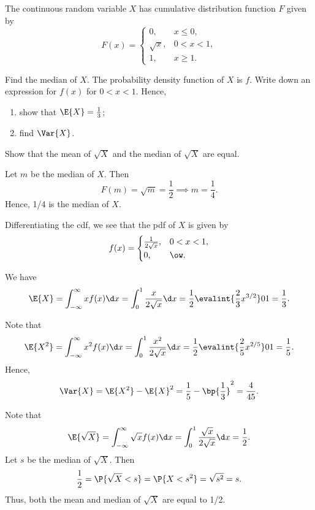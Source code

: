 \begin{problem}
    The continuous random variable $X$ has cumulative distribution function $F$ given by \[F(x) = \begin{cases}
        0, & x \leq 0,\\
        \sqrt{x}, & 0 < x < 1, \\
        1, & x \geq 1.
    \end{cases}\]

    Find the median of $X$. The probability density function of $X$ is $f$. Write down an expression for $f(x)$ for $0 < x < 1$. Hence,
    \begin{enumerate}
        \item show that $\E{X} = \frac13$;
        \item find $\Var{X}$.
    \end{enumerate}

    Show that the mean of $\sqrt{X}$ and the median of $\sqrt{X}$ are equal.
\end{problem}
\begin{solution}
    Let $m$ be the median of $X$. Then \[F(m) = \sqrt{m} = \frac12 \implies m = \frac14.\] Hence, 1/4 is the median of $X$.

    Differentiating the cdf, we see that the pdf of $X$ is given by \[f(x) = \begin{cases}
        \frac1{2\sqrt{x}}, & 0 < x < 1,\\
        0, & \ow.
    \end{cases}\]
    
    \begin{ppart}
        We have \[\E{X} = \int_{-\infty}^{\infty} x f(x) \d x = \int_0^1 \frac{x}{2\sqrt{x}} \d x = \frac12 \evalint{\frac23 x^{3/2}}01 = \frac13.\]
    \end{ppart}
    \begin{ppart}
        Note that \[\E{X^2} = \int_{-\infty}^{\infty} x^2 f(x) \d x = \int_0^1 \frac{x^2}{2\sqrt{x}} \d x = \frac12 \evalint{\frac25 x^{2/5}}01 = \frac15.\] Hence, \[\Var{X} = \E{X^2} - \E{X}^2 = \frac15 - \bp{\frac13}^2 = \frac4{45}.\]
    \end{ppart}

    Note that \[\E{\sqrt{X}} = \int_{-\infty}^{\infty} \sqrt{x} f(x) \d x = \int_0^1 \frac{\sqrt{x}}{2\sqrt{x}} \d x = \frac12.\] Let $s$ be the median of $\sqrt{X}$. Then \[\frac12 = \P{\sqrt{X} < s} = \P{X < s^2} = \sqrt{s^2} = s.\] Thus, both the mean and median of $\sqrt{X}$ are equal to 1/2.
\end{solution}

